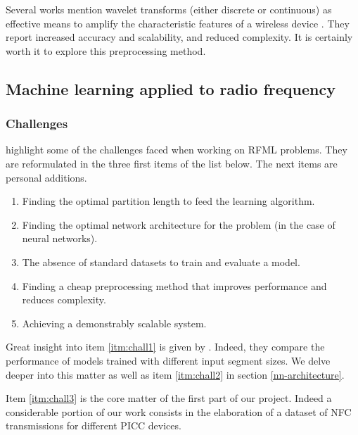 Several works mention wavelet transforms (either discrete or continuous) as effective means to amplify the characteristic features of a wireless device \cite{xu_device_2015, oyedare_estimating_2019, youssef_machine_2017}. They report increased accuracy and scalability, and reduced complexity. It is certainly worth it to explore this preprocessing method.

\subsection{Machine learning applied to radio frequency}

\subsubsection{Challenges} \label{challenges}

\textcite{riyaz_deep_2018} highlight some of the challenges faced when working on RFML problems. They are reformulated in the three first items of the list below. The next items are personal additions.

\begin{enumerate}
  \item \label{itm:chall1} Finding the optimal partition length to feed the learning algorithm.
  \item \label{itm:chall2} Finding the optimal network architecture for the problem (in the case of neural networks).
  \item \label{itm:chall3} The absence of standard datasets to train and evaluate a model.
  \item Finding a cheap preprocessing method that improves performance and reduces complexity.
  \item Achieving a demonstrably scalable system.
\end{enumerate}

Great insight into item \ref{itm:chall1} is given by \textcite{youssef_machine_2017}. Indeed, they compare the performance of models trained with different input segment sizes. We delve deeper into this matter as well as item \ref{itm:chall2} in section \ref{nn-architecture}.

Item \ref{itm:chall3} is the core matter of the first part of our project. Indeed a considerable portion of our work consists in the elaboration of a dataset of NFC transmissions for different PICC devices.


